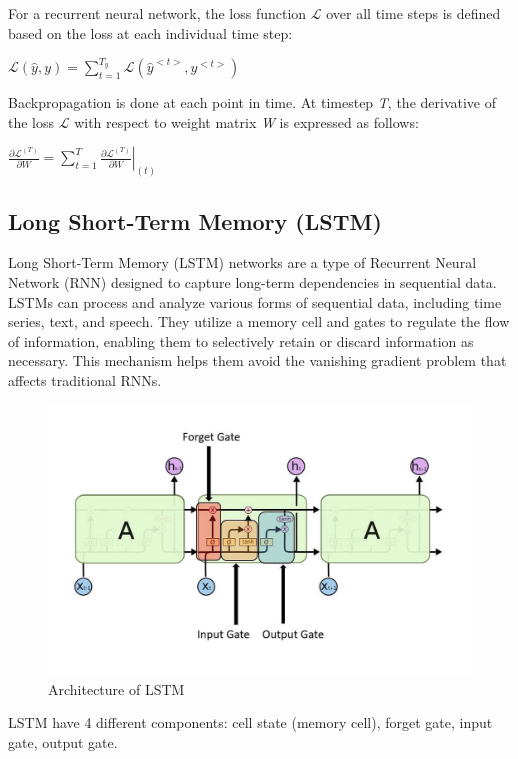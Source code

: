 \documentclass{ieeeojies}
\begin{document}
For a recurrent neural network, the loss function $\mathcal{L}$ over all time steps is defined based on the loss at each individual time step:
\newline \centerline{$\mathcal{L}(\hat{y},y) = \displaystyle \sum_{t=1}^{T_{y}}\mathcal{L}(\hat{y}^{<t>},y^{<t>})$}
Backpropagation is done at each point in time. At timestep \textit{T}, the derivative of the loss $\mathcal{L}$ with respect to weight matrix \textit{W} is expressed as follows:
\newline \centerline{$\displaystyle \frac{\partial \mathcal{L}^{(T)}}{\partial W} = \displaystyle \sum_{t=1}^{T} \left. \frac{\partial \mathcal{L}^{(T)}}{\partial W} \right|_{(t)}$}
\subsection{Long Short-Term Memory (LSTM)}
Long Short-Term Memory \cite{b11} (LSTM) networks are a type of Recurrent Neural Network (RNN) designed to capture long-term dependencies in sequential data. LSTMs can process and analyze various forms of sequential data, including time series, text, and speech. They utilize a memory cell and gates to regulate the flow of information, enabling them to selectively retain or discard information as necessary. This mechanism helps them avoid the vanishing gradient problem that affects traditional RNNs.
\begin{figure}[H]
	\centering
	\begin{minipage}{0.32\textwidth}
		\centering
		\includegraphics[width=1\textwidth]{bibliography/Images/LSTM_Img1.jpg}
		\caption{Architecture of LSTM}
		\label{fig:1}
	\end{minipage}
\end{figure}
LSTM have 4 different components: cell state (memory cell), forget gate, input gate, output gate.
\end{document}
